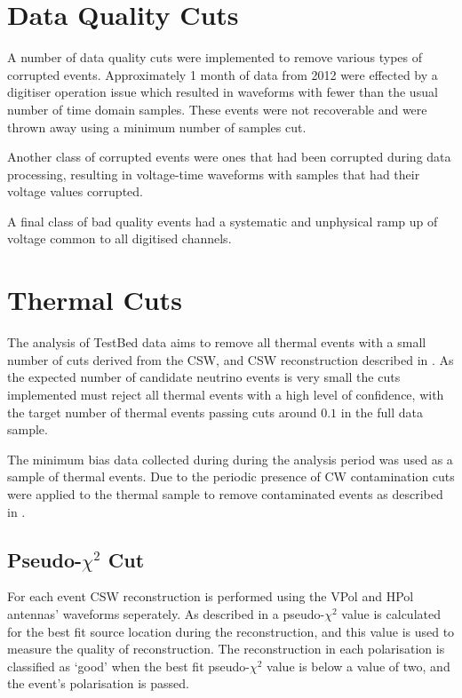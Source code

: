 \section{Data Quality Cuts}
\label{sec:Analysis:Data-Quality-Cuts}

A number of data quality cuts were implemented to remove various types of corrupted events. Approximately 1 month of data from 2012 were effected by a digitiser operation issue which resulted in waveforms with fewer than the usual number of time domain samples. These events were not recoverable and were thrown away using a minimum number of samples cut.

Another class of corrupted events were ones that had been corrupted during data processing, resulting in voltage-time waveforms with samples that had their voltage values corrupted.

A final class of bad quality events had a systematic and unphysical ramp up of voltage common to all digitised channels.


\section{Thermal Cuts}
\label{sec:Analysis:Thermal-Cuts}

The analysis of TestBed data aims to remove all thermal events with a small number of cuts derived from the CSW, and CSW reconstruction described in . As the expected number of candidate neutrino events is very small the cuts implemented must reject all thermal events with a high level of confidence, with the target number of thermal events passing cuts around $0.1$ in the full data sample.

The minimum bias data collected during during the analysis period was used as a sample of thermal events. Due to the periodic presence of CW contamination cuts were applied to the thermal sample to remove contaminated events as described in . 

\subsection{Pseudo-$\chi^{2}$ Cut}
\label{sec:Analysis:Thermal-Cuts:Pseudo-ChiSq}

For each event CSW reconstruction is performed using the VPol and HPol antennas' waveforms seperately. As described in  a pseudo-$\chi^{2}$ value is calculated for the best fit source location during the reconstruction, and this value is used to measure the quality of reconstruction. The reconstruction in each polarisation is classified as `good' when the best fit pseudo-$\chi^{2}$ value is below a value of two, and the event's polarisation is passed.

